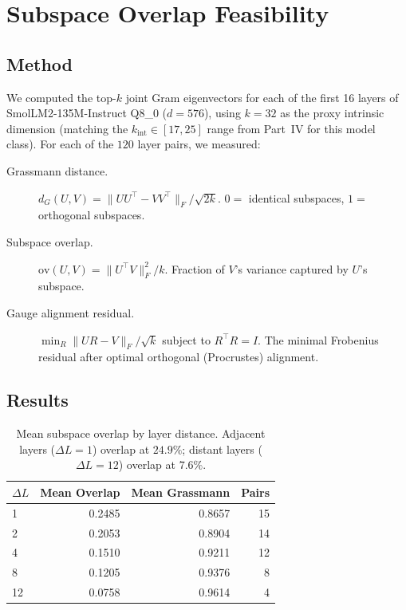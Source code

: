 \documentclass[11pt]{article}
\begin{document}
\section{Subspace Overlap Feasibility}
\label{sec:feasibility}

\subsection{Method}

We computed the top-$k$ joint Gram eigenvectors for each of the first
16 layers of SmolLM2-135M-Instruct Q8\_0 ($d{=}576$), using
$k{=}32$ as the proxy intrinsic dimension (matching the $k_{\mathrm{int}}
\in[17,25]$ range from Part~IV for this model class).  For each of the
$120$ layer pairs, we measured:

\begin{description}
\item[Grassmann distance.]  $d_G(U,V) = \|UU^\top - VV^\top\|_F / \sqrt{2k}$.
      $0 =$ identical subspaces, $1 =$ orthogonal subspaces.

\item[Subspace overlap.]  $\mathrm{ov}(U,V) = \|U^\top V\|_F^2 / k$.
      Fraction of $V$'s variance captured by $U$'s subspace.

\item[Gauge alignment residual.]  $\min_R \|UR - V\|_F / \sqrt{k}$
      subject to $R^\top R = I$.  The minimal Frobenius residual after
      optimal orthogonal (Procrustes) alignment.
\end{description}

\subsection{Results}

\begin{table}[h]\centering\small
\caption{Mean subspace overlap by layer distance.  Adjacent layers
($\Delta L{=}1$) overlap at $24.9\%$; distant layers ($\Delta L{=}12$)
overlap at $7.6\%$.}
\label{tab:overlap-by-distance}
\begin{tabular}{@{}lrrr@{}}
\toprule
$\Delta L$ & Mean Overlap & Mean Grassmann & Pairs \\
\midrule
1  & 0.2485 & 0.8657 & 15 \\
2  & 0.2053 & 0.8904 & 14 \\
4  & 0.1510 & 0.9211 & 12 \\
8  & 0.1205 & 0.9376 & 8 \\
12 & 0.0758 & 0.9614 & 4 \\
\bottomrule
\end{tabular}
\end{table}
\end{document}
